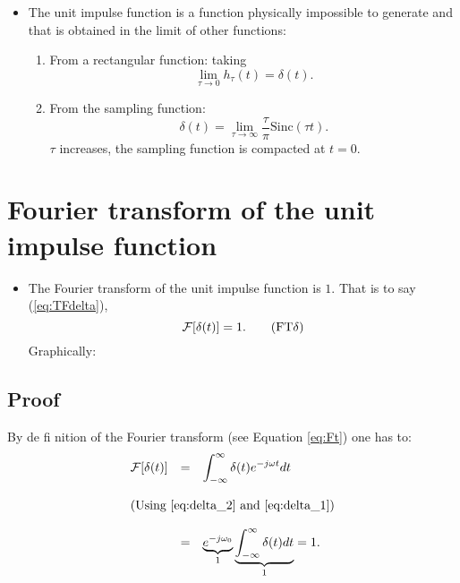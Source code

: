 \begin{itemize}
\item The unit impulse function is a function physically impossible to
  generate and that is obtained in the limit of other functions:
  \begin{enumerate}
  \item From a rectangular function:
    taking
    $$
    \lim_{\tau\rightarrow0}h_\tau(t) = \delta(t).
    $$
  \item From the sampling function:
    \begin{equation}
      \delta(t) =
      \lim_{\tau\rightarrow\infty}\frac{\tau}{\pi}\mathrm{Sinc}(\tau
      t).  \tag{delta\_sinc}
      \label{eq:delta_sinc}
    \end{equation}
    $\tau$ increases, the sampling function is compacted at $t=0$.
  \end{enumerate}
\end{itemize}

\section{Fourier transform of the unit impulse function}
\begin{itemize}
\item [] The Fourier transform of the unit impulse function is
  $1$. That is to say (\ref{eq:TFdelta}),
  \begin{equation}
    {\cal{F}}[\delta(t)]=1.
    \tag{FT$\delta$}
    \label{eq:TFdelta}
  \end{equation}
  Graphically:
\end{itemize}

\subsection*{Proof}
By de fi nition of the Fourier transform (see Equation \ref{eq:Ft}) one has to:
\begin{equation*}
  \begin{array}{rcl}
    {\cal F}[\delta(t)] & = & \displaystyle\int_{-\infty}^\infty\delta(t)e^{-j\omega t}dt\\\\
    \multicolumn{3}{l}{\text{(Using \ref{eq:delta_2} and \ref{eq:delta_1})}}\\\\
    & = & \underbrace{e^{-j\omega_0}}_{1}\underbrace{\displaystyle\int_{-\infty}^\infty\delta(t)dt}_{1} = 1.
  \end{array}
\end{equation*}

